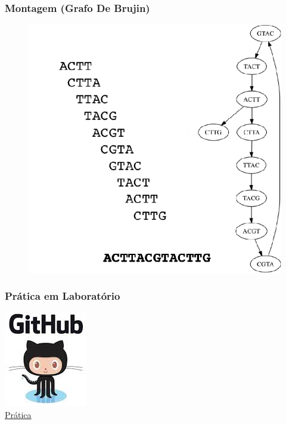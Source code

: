 \documentclass{beamer}
\begin{document}
		\begin{frame}\frametitle{Montagem (Grafo De Brujin)}
		\begin{figure}[ht]
			\centering
			\includegraphics[width=.6\textwidth]{img/dbrujin.png}
		\end{figure}
		\end{frame}
	
		\begin{frame}\frametitle{Prática em Laboratório}
		\centering
		\href{https://github.com/waldeyr/bsb2018}{\includegraphics[scale=0.5]{img/git.png}\\Prática}
		\end{frame}
	
		
\end{document}
